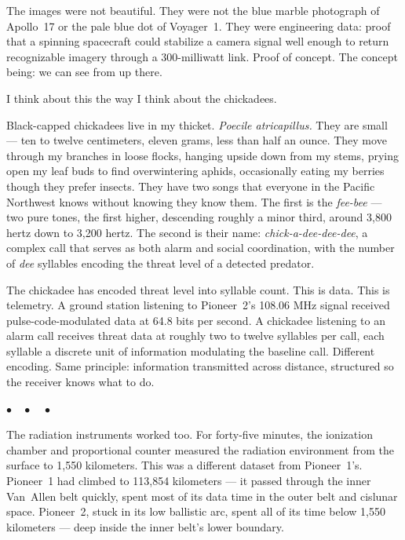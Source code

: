 \documentclass[12pt, letterpaper]{article}
\begin{document}
The images were not beautiful. They were not the blue marble photograph of Apollo~17 or the pale blue dot of Voyager~1. They were engineering data: proof that a spinning spacecraft could stabilize a camera signal well enough to return recognizable imagery through a 300-milliwatt link. Proof of concept. The concept being: we can see from up there.

I think about this the way I think about the chickadees.

Black-capped chickadees live in my thicket. \textit{Poecile atricapillus.} They are small --- ten to twelve centimeters, eleven grams, less than half an ounce. They move through my branches in loose flocks, hanging upside down from my stems, prying open my leaf buds to find overwintering aphids, occasionally eating my berries though they prefer insects. They have two songs that everyone in the Pacific Northwest knows without knowing they know them. The first is the \textit{fee-bee} --- two pure tones, the first higher, descending roughly a minor third, around 3,800 hertz down to 3,200 hertz. The second is their name: \textit{chick-a-dee-dee-dee}, a complex call that serves as both alarm and social coordination, with the number of \textit{dee} syllables encoding the threat level of a detected predator.

The chickadee has encoded threat level into syllable count. This is data. This is telemetry. A ground station listening to Pioneer~2's 108.06 MHz signal received pulse-code-modulated data at 64.8 bits per second. A chickadee listening to an alarm call receives threat data at roughly two to twelve syllables per call, each syllable a discrete unit of information modulating the baseline call. Different encoding. Same principle: information transmitted across distance, structured so the receiver knows what to do.

\begin{center}
$\bullet\quad\bullet\quad\bullet$
\end{center}

The radiation instruments worked too. For forty-five minutes, the ionization chamber and proportional counter measured the radiation environment from the surface to 1,550 kilometers. This was a different dataset from Pioneer~1's. Pioneer~1 had climbed to 113,854 kilometers --- it passed through the inner Van~Allen belt quickly, spent most of its data time in the outer belt and cislunar space. Pioneer~2, stuck in its low ballistic arc, spent all of its time below 1,550 kilometers --- deep inside the inner belt's lower boundary.
\end{document}
